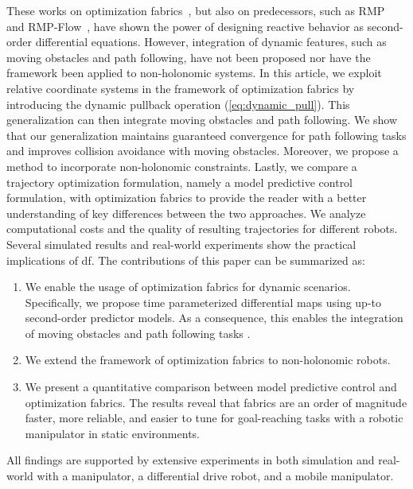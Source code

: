 These works on optimization fabrics~\cite{Ratliff2020}, but also on
predecessors, such as RMP~\cite{Cheng2018} and RMP-Flow~,
have shown the power of designing reactive behavior as second-order
differential equations. However, integration of dynamic features, such as
moving obstacles and path following, have not been proposed
nor have the framework been applied to non-holonomic systems.
In this article, we exploit relative coordinate systems in the framework of
optimization fabrics by introducing the dynamic pullback operation (\cref{eq:dynamic_pull}).
This generalization 
can then integrate moving obstacles and path following.
We show that our generalization maintains
guaranteed convergence for path following tasks and improves collision
avoidance with moving obstacles.
Moreover, we propose a method
to incorporate non-holonomic constraints.
Lastly, we compare a trajectory optimization formulation, namely a model
predictive control formulation, with optimization fabrics to provide the reader
with a better understanding of key differences between the two approaches.
We analyze computational costs and the quality of resulting trajectories
for different robots.
%
Several simulated results and real-world experiments
show the practical implications of \ac{df}. The contributions of this paper can be
summarized as:


\begin{enumerate}
  \item We enable the usage of optimization fabrics for dynamic scenarios.
    Specifically, we propose time parameterized differential maps using up-to
    second-order predictor models. As a consequence, this enables the
    integration of moving obstacles and path following tasks
    .
  \item We extend the framework of optimization fabrics to non-holonomic robots.
  \item We present a quantitative comparison between model predictive control and
  optimization fabrics. The results reveal that fabrics are an order of magnitude faster,
  more reliable, and easier to tune for goal-reaching tasks with a robotic manipulator in
  static environments.
\end{enumerate}
All findings are supported by extensive experiments in both simulation and real-world
with a manipulator, a differential drive robot, and a mobile manipulator.
